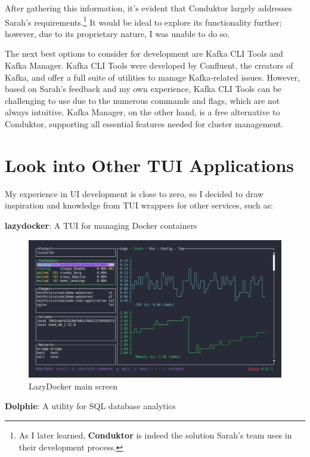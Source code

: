 \documentclass[10pt , a4paper]{report}
\begin{document}
After gathering this information, it’s evident that Conduktor largely addresses Sarah's requirements.\footnote{As I later learned, \textbf{Conduktor} is indeed the solution Sarah's team uses in their development process.} It would be ideal to explore its functionality further; however, due to its proprietary nature, I was unable to do so.

The next best options to consider for development are Kafka CLI Tools and Kafka Manager. Kafka CLI Tools were developed by Confluent, the creators of Kafka, and offer a full suite of utilities to manage Kafka-related issues. However, based on Sarah's feedback and my own experience, Kafka CLI Tools can be challenging to use due to the numerous commands and flags, which are not always intuitive. Kafka Manager, on the other hand, is a free alternative to Conduktor, supporting all essential features needed for cluster management. 

\newpage
\section{Look into Other TUI Applications}

My experience in UI development is close to zero, so I decided to draw inspiration and knowledge from TUI wrappers for other services, such as:

\textbf{lazydocker}: A TUI for managing Docker containers

\begin{figure}[htbp]
    \centering
    \includegraphics[width=.9\linewidth]{imgs/LazyDocker.png}
    \caption{LazyDocker main screen}
    \label{fig:enter-label}
\end{figure}

\textbf{Dolphie}: A utility for SQL database analytics
\end{document}
